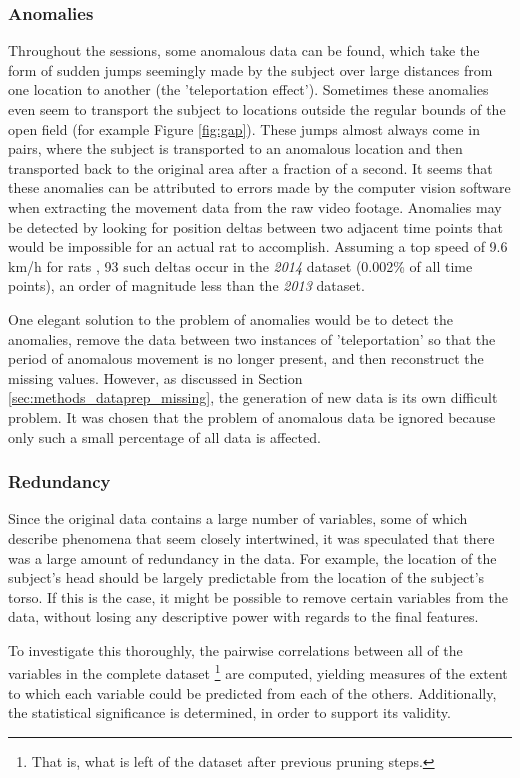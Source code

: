 \documentclass[conference,a4paper,twoside]{IEEEtran}
\begin{document}
\subsubsection{Anomalies}
Throughout the sessions, some anomalous data can be found, which take the form of sudden jumps seemingly made by the subject over large distances from one location to another (the 'teleportation effect'). Sometimes these anomalies even seem to transport the subject to locations outside the regular bounds of the open field (for example Figure \ref{fig:gap}). These jumps almost always come in pairs, where the subject is transported to an anomalous location and then transported back to the original area after a fraction of a second. It seems that these anomalies can be attributed to errors made by the computer vision software when extracting the movement data from the raw video footage. Anomalies may be detected by looking for position deltas between two adjacent time points that would be impossible for an actual rat to accomplish. Assuming a top speed of 9.6 km/h for rats \cite{wolfram}, 93 such deltas occur in the \emph{2014} dataset (0.002\% of all time points), an order of magnitude less than the \emph{2013} dataset.

One elegant solution to the problem of anomalies would be to detect the anomalies, remove the data between two instances of 'teleportation' so that the period of anomalous movement is no longer present, and then reconstruct the missing values. However, as discussed in Section \ref{sec:methods_dataprep_missing}, the generation of new data is its own difficult problem. It was chosen that the problem of anomalous data be ignored because only such a small percentage of all data is affected.

\subsubsection{Redundancy}
Since the original data contains a large number of variables, some of which describe phenomena that seem closely intertwined, it was speculated that there was a large amount of redundancy in the data. For example, the location of the subject's head should be largely predictable from the location of the subject's torso. If this is the case, it might be possible to remove certain variables from the data, without losing any descriptive power with regards to the final features.

To investigate this thoroughly, the pairwise correlations between all of the variables in the complete dataset \footnote{That is, what is left of the dataset after previous pruning steps.} are computed, yielding measures of the extent to which each variable could be predicted from each of the others. Additionally, the statistical significance is determined, in order to support its validity.
\end{document}
